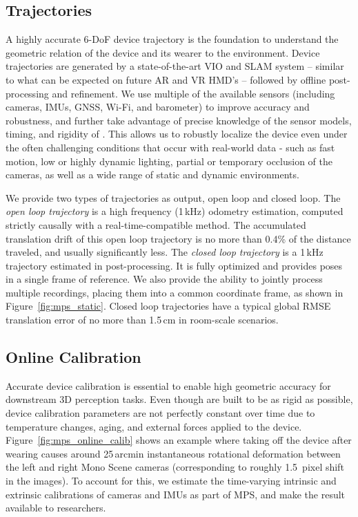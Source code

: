 \subsection{Trajectories}
\label{sec:trajectories}

A highly accurate 6-DoF device trajectory is the foundation to understand the geometric relation of the device and its wearer to the environment. Device trajectories are generated by a state-of-the-art VIO and SLAM system -- similar to what can be expected on future AR and VR HMD's -- followed by offline post-processing and refinement. We use multiple of the available sensors (including cameras, IMUs, GNSS, Wi-Fi, and barometer) to improve accuracy and robustness, and further take advantage of precise knowledge of the sensor models, timing, and rigidity of \AriaDevices{}. This allows us to robustly localize the device even under the often challenging conditions that occur with real-world data - such as fast motion, low or highly dynamic lighting, partial or temporary occlusion of the cameras, as well as a wide range of static and dynamic environments. 

We provide two types of trajectories as output, open loop and closed loop.  The \textit{open loop trajectory} is a high frequency (1\,kHz) odometry estimation, computed strictly causally with a real-time-compatible method. The accumulated translation drift of this open loop trajectory is no more than 0.4\% of the distance traveled, and usually significantly less. The \textit{closed loop trajectory} is a 1\,kHz trajectory estimated in post-processing. It is fully optimized and provides poses in a single frame of reference. We also provide the ability to jointly process multiple recordings, placing them into a common coordinate frame, as shown in Figure~\ref{fig:mps_static}. Closed loop trajectories have a typical global RMSE translation error of no more than 1.5\,cm in room-scale scenarios. 


\subsection{Online Calibration}
\label{sec:onlinecalib}

Accurate device calibration is essential to enable high geometric accuracy for downstream 3D perception tasks.
Even though \AriaDevices{} are built to be as rigid as possible, device calibration parameters are not perfectly constant over time due to temperature changes, aging, and external forces applied to the device. 
Figure~\ref{fig:mps_online_calib} shows an example where taking off the device after wearing causes around 25\,arc\-min instantaneous rotational deformation between the left and right Mono Scene cameras (corresponding to roughly 1.5~pixel shift in the images). 
To account for this, we estimate the time-varying intrinsic and extrinsic calibrations of cameras and IMUs as part of MPS, and make the result available to researchers. 


